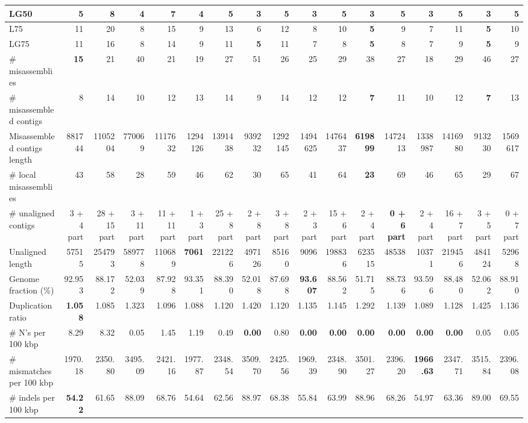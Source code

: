 \documentclass[12pt,a4paper]{article}
\begin{document}
\begin{table}[ht]
\begin{center}
\begin{tabular}{|l*{16}{|r}|}
LG50 & 5 & 8 & 4 & 7 & 4 & 5 & {\bf 3} & 5 & {\bf 3} & 5 & {\bf 3} & 5 & {\bf 3} & 5 & {\bf 3} & 5 \\ \hline
L75 & 11 & 20 & 8 & 15 & 9 & 13 & 6 & 12 & 8 & 10 & {\bf 5} & 9 & 7 & 11 & {\bf 5} & 10 \\ \hline
LG75 & 11 & 16 & 8 & 14 & 9 & 11 & {\bf 5} & 11 & 7 & 8 & {\bf 5} & 8 & 7 & 9 & {\bf 5} & 9 \\ \hline
\# misassemblies & {\bf 15} & 21 & 40 & 21 & 19 & 27 & 51 & 26 & 25 & 29 & 38 & 27 & 18 & 29 & 46 & 27 \\ \hline
\# misassembled contigs & 8 & 14 & 10 & 12 & 13 & 14 & 9 & 14 & 12 & 12 & {\bf 7} & 11 & 10 & 12 & {\bf 7} & 13 \\ \hline
Misassembled contigs length & 881744 & 1105204 & 770069 & 1117632 & 1294126 & 1391438 & 939232 & 1292145 & 1494625 & 1476437 & {\bf 619899} & 1472413 & 1338987 & 1416980 & 913230 & 1569617 \\ \hline
\# local misassemblies & 43 & 58 & 28 & 59 & 46 & 62 & 30 & 65 & 41 & 64 & {\bf 23} & 69 & 46 & 65 & 29 & 67 \\ \hline
\# unaligned contigs & 3 + 4 part & 28 + 15 part & 3 + 11 part & 11 + 11 part & 1 + 3 part & 25 + 8 part & 2 + 8 part & 3 + 8 part & 2 + 3 part & 15 + 6 part & 2 + 4 part & {\bf 0 + 6 part} & 2 + 4 part & 16 + 7 part & 3 + 5 part & 0 + 7 part \\ \hline
Unaligned length & 57515 & 254793 & 589778 & 110689 & {\bf 7061} & 221226 & 497126 & 85160 & 9096 & 198836 & 623515 & 48538 & 10371 & 219456 & 484124 & 52968 \\ \hline
Genome fraction (\%) & 92.953 & 88.172 & 52.039 & 87.928 & 93.351 & 88.390 & 52.018 & 87.698 & {\bf 93.607} & 88.562 & 51.715 & 88.736 & 93.596 & 88.480 & 52.062 & 88.910 \\ \hline
Duplication ratio & {\bf 1.058} & 1.085 & 1.323 & 1.096 & 1.088 & 1.120 & 1.420 & 1.120 & 1.135 & 1.145 & 1.292 & 1.139 & 1.089 & 1.128 & 1.425 & 1.136 \\ \hline
\# N's per 100 kbp & 8.29 & 8.32 & 0.05 & 1.45 & 1.19 & 0.49 & {\bf 0.00} & 0.80 & {\bf 0.00} & {\bf 0.00} & {\bf 0.00} & {\bf 0.00} & {\bf 0.00} & {\bf 0.00} & 0.05 & 0.05 \\ \hline
\# mismatches per 100 kbp & 1970.18 & 2350.80 & 3495.09 & 2421.16 & 1977.87 & 2348.54 & 3509.70 & 2425.56 & 1969.39 & 2348.90 & 3501.27 & 2396.20 & {\bf 1966.63} & 2347.71 & 3515.84 & 2396.08 \\ \hline
\# indels per 100 kbp & {\bf 54.22} & 61.65 & 88.09 & 68.76 & 54.64 & 62.56 & 88.97 & 68.38 & 55.84 & 63.99 & 88.96 & 68.26 & 54.97 & 63.36 & 89.00 & 69.55 \\ \hline

\end{tabular}
\end{center}
\end{table}
\end{document}
